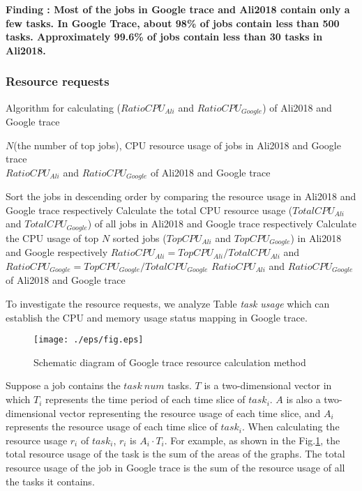 \documentclass[conference]{IEEEtran}
\begin{document}
{\bfseries Finding \theFindingcounter: Most of the jobs in Google trace and Ali2018 contain only a few tasks. In Google Trace, about 98\% of jobs contain less than 500 tasks. Approximately 99.6\% of jobs contain less than 30 tasks in Ali2018.}

\subsubsection{Resource requests}
\begin{algorithm}
\caption{Algorithm for calculating ($RatioCPU_{Ali}$ and $RatioCPU_{Google}$) of Ali2018 and Google trace}
\label{alg:ratio cpu}
\hspace*{0.02in}{\bf Input:}
 $N$(the number of top jobs), CPU resource usage of jobs in Ali2018 and Google trace\\
\hspace*{0.02in}{\bf Output:}
$RatioCPU_{Ali}$ and $RatioCPU_{Google}$ of Ali2018 and Google trace
\begin{algorithmic}[1]
\State Sort the jobs in descending order by comparing the resource usage in Ali2018 and Google trace respectively
\State Calculate the total CPU resource usage ($TotalCPU_{Ali}$ and $TotalCPU_{Google}$) of all jobs in Ali2018 and Google trace respectively
\State Calculate the CPU usage of top $N$ sorted jobs ($TopCPU_{Ali}$ and $TopCPU_{Google}$) in Ali2018 and Google respectively
\State  $RatioCPU_{Ali} = TopCPU_{Ali} / TotalCPU_{Ali}$ and $RatioCPU_{Google} = TopCPU_{Google} / TotalCPU_{Google}$
\State \Return $RatioCPU_{Ali}$ and $RatioCPU_{Google}$ of Ali2018 and Google trace
\end{algorithmic}
\end{algorithm}
To investigate the resource requests, we analyze Table \emph{task usage}\cite{reiss2011google} which can establish the CPU and memory usage status mapping in Google trace.  
\begin{figure}[htbp]
\centerline{\texttt{[image: ./eps/fig.eps]}}
\caption{Schematic diagram of Google trace resource calculation method}
\label{Fig:algorithm fig}
\end{figure}

Suppose a job contains the  $task\ num$  tasks. $T$ is a two-dimensional vector  in which $T_i$ represents the time period of each time slice of $task_i$. $A$ is also a two-dimensional vector representing the resource usage of each time slice, and $A_i$ represents the resource usage of each time slice of $task_i$. When calculating the resource usage $r_i$  of $task_i$, $r_i$ is $A_i  \cdot  T_i$. For example, as shown in the Fig.\ref{Fig:algorithm fig}, the total resource usage of the task is the sum of the areas of the graphs. The total resource usage of the job in Google trace is the sum of the resource usage of all the tasks it contains.
\end{document}
